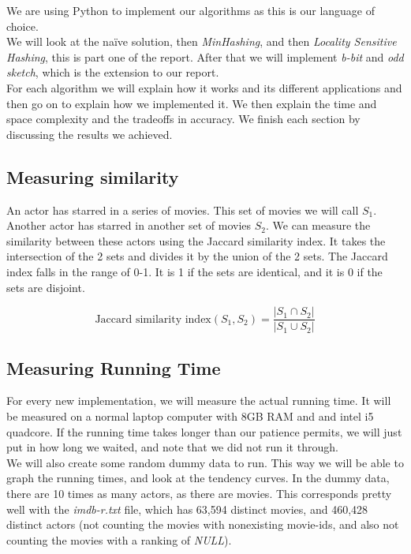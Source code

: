 \documentclass[a4paper,11pt]{article}
\begin{document}
We are using Python to implement our algorithms as this is our language of choice. \\

We will look at the naïve solution, then \emph{MinHashing}, and then \emph{Locality Sensitive Hashing}, this is part one of the report. After that we will implement \emph{b-bit} and \emph{odd sketch}, which is the extension to our report.\\

For each algorithm we will explain how it works and its different applications and then go on to explain how we implemented it. We then explain the time and space complexity and the tradeoffs in accuracy. We finish each section by discussing the results we achieved.\\


\subsection{Measuring similarity}
An actor has starred in a series of movies. This set of movies we will call $S_1$. Another actor has starred in another set of movies $S_2$. We can measure the similarity between these actors using the Jaccard similarity index. It takes the intersection of the 2 sets and divides it by the union of the 2 sets. The Jaccard index falls in the range of 0-1. It is 1 if the sets are identical, and it is 0 if the sets are disjoint.

\begin{equation}
\text{Jaccard similarity index} (S_1, S_2) = \frac{|S_1 \cap S_2|}{|S_1 \cup S_2|}
\end{equation}



\subsection{Measuring Running Time}

For every new implementation, we will measure the actual running time. It will be measured on a normal laptop computer with 8GB RAM and and intel i5 quadcore. If the running time takes longer than our patience permits, we will just put in how long we waited, and note that we did not run it through.\\

We will also create some random dummy data to run. This way we will be able to graph the running times, and look at the tendency curves. In the dummy data, there are 10 times as many actors, as there are movies. This corresponds pretty well with the \emph{imdb-r.txt} file, which has 63,594 distinct movies, and 460,428 distinct actors (not counting the movies with nonexisting movie-ids, and also not counting the movies with a ranking of \emph{NULL}).\\
\end{document}

